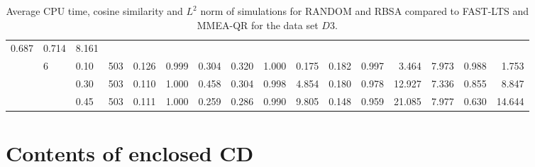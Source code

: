 \documentclass[thesis=B,english]{FITthesis}[2012/10/20]
\begin{document}
\begin{table}[h!]
\begin{adjustbox}{angle=90}
{\begin{tabular}{ll|l|l|r|r|r|r|r|r|r|r|r|r|r|r|}
0.687 &  0.714 &   8.161 \\     & 6 & 0.10 & 503 &    0.126 &  0.999 &  0.304 &   0.320 &  1.000 &  0.175 &  0.182 &  0.997 &   3.464 &  7.973 &  0.988 &   1.753 \\     &   & 0.30 & 503 &    0.110 &  1.000 &  0.458 &   0.304 &  0.998 &  4.854 &  0.180 &  0.978 &  12.927 &  7.336 &  0.855 &   8.847 \\     &   & 0.45 & 503 &    0.111 &  1.000 &  0.259 &   0.286 &  0.990 &  9.805 &  0.148 &  0.959 &  21.085 &  7.977 &  0.630 &  14.644 \\
                         
                 \hline
                \end{tabular}
			}
			
\end{adjustbox}
    
    \caption{Average CPU time, cosine similarity and $L^2$ norm of simulations for RANDOM and RBSA  compared to FAST-LTS and MMEA-QR for the data set $D3$.}
    \label{table:randim:3}
\end{table}






\chapter{Contents of enclosed CD}
\begin{figure}
\end{figure}
\end{document}
